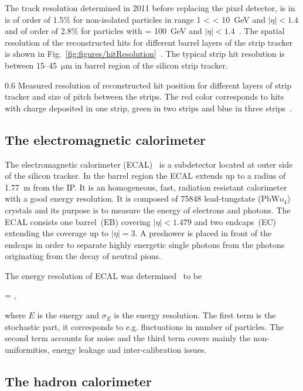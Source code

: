 The track resolution determined in 2011 before replacing the pixel detector, is in \pt is of order of 1.5\% for non-isolated particles in range 1 < \pt < 10~GeV and $|\eta| < 1.4$ and of order of 2.8\% for particles with \pt = 100~GeV and $|\eta| < 1.4$~\cite{TRK-11-001}. The spatial resolution of the reconstructed hits for different barrel layers of the strip tracker is shown in Fig.~\ref{fig:figures/hitResolution}~\cite{website:hitEff}. The typical strip hit resolution is between 15--45~$\mathrm{\mu m}$ in barrel region of the silicon strip tracker.


                 {0.6}       
                 {Measured resolution of reconstructed hit position for different layers of strip tracker and size of pitch between the strips. The red color corresponds to hits with charge deposited in one strip, green in two strips and blue in three strips~\cite{website:hitEff}. }

\subsection{The electromagnetic calorimeter}

The electromagnetic calorimeter (ECAL)~\cite{tdrECAL} is a subdetector located at outer side of the silicon tracker. In the barrel region the ECAL extends up to a radius of 1.77~m from the IP. It is an homogeneous, fast, radiation resistant calorimeter with a good energy resolution. It is composed of 75848 lead-tungstate ($\mathrm{PbWo_{4}}$) crystals and its purpose is to measure the energy of electrons and photons. The ECAL consists one barrel~(EB) covering $|\eta|<1.479$ and two endcaps~(EC) extending the coverage up to $|\eta| =3$. A preshower is placed in front of the endcaps in order to separate highly energetic single photons from the photons originating from the decay of neutral pions.

The energy resolution of ECAL was determined~\cite{Chatrchyan:2008aa} to be

{
  =  \bigoplus {}  ,
}

where $E$ is the energy and $\sigma_{E}$ is the energy resolution. The first term is the stochastic part, it corresponds to e.g. fluctuations in number of particles. The second term accounts for noise and the third term covers mainly the non-uniformities, energy leakage and inter-calibration issues.


\subsection{The hadron calorimeter}

